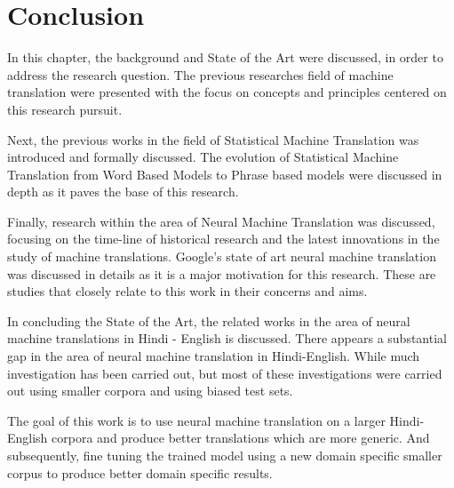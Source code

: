 \section{Conclusion}

In this chapter, the background and State of the Art were discussed, in order to address the research question. The previous researches field of machine translation were presented with the focus on concepts and principles centered on this research pursuit.

Next, the previous works in the field of Statistical Machine Translation was introduced and formally discussed. The evolution of Statistical Machine Translation from Word Based Models to Phrase based models were discussed in depth as it paves the base of this research.

Finally, research within the area of Neural Machine Translation was discussed, focusing on the time-line of historical research and the latest innovations in the study of machine translations. Google's state of art neural machine translation was discussed in details as it is a major motivation for this research. These are studies that closely relate to this work in their concerns and aims.

In concluding the State of the Art, the related works in the area of neural machine translations in Hindi - English is discussed. There appears a substantial gap in the area of neural machine translation in Hindi-English. While much investigation has been carried out, but most of these investigations were carried out using smaller corpora and using biased test sets.

The goal of this work is to use neural machine translation on a larger Hindi-English corpora and produce better translations which are more generic. And subsequently, fine tuning the trained model using a new domain specific smaller corpus to produce better domain specific results.  
